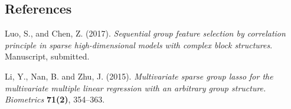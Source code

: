 \documentclass[12pt]{article}
\begin{document}
\subsection*{References}

\begin{description}
\item
Luo, S., and Chen, Z. (2017).
\textit{Sequential group feature selection by correlation principle in sparse high-dimensional models with complex block structures}.
Manuscript, submitted.

\item
Li, Y., Nan, B. and Zhu, J. (2015).
\textit{Multivariate sparse group lasso for the multivariate multiple
linear regression with an arbitrary group structure.
} \textit{Biometrics} \textbf{71(2)},  354--363.

\end{description}
\end{document}
